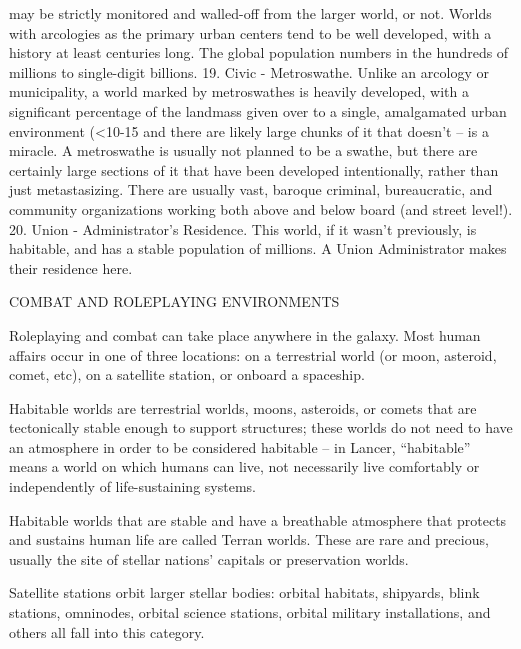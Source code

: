          may be strictly monitored and walled-off from the larger world, or not. Worlds with  
         arcologies as the primary urban centers tend to be well developed, with a history at least  
         centuries long. The global population numbers in the hundreds of millions to single-digit  
         billions.   
     19. Civic - Metroswathe. Unlike an arcology or municipality, a world marked by metroswathes  
         is heavily developed, with a significant percentage of the landmass given over to a single,  
         amalgamated urban environment (<10-15%
         and there are likely large chunks of it that doesn’t -- is a miracle. A metroswathe is usually  
         not planned to be a swathe, but there are certainly large sections of it that have been  
         developed intentionally, rather than just metastasizing. There are usually vast, baroque  
         criminal, bureaucratic, and community organizations working both above and below board  
         (and street level!).   
    20. Union - Administrator’s Residence. This world, if it wasn’t previously, is habitable, and has  
         a stable population of millions. A Union Administrator makes their residence here.    

COMBAT AND ROLEPLAYING ENVIRONMENTS  

Roleplaying and combat can take place anywhere in the galaxy. Most human affairs occur in one  
of three locations: on a terrestrial world (or moon, asteroid, comet, etc), on a satellite station, or  
onboard a spaceship. 
 

                                                                                                                    


Habitable worlds are terrestrial worlds, moons, asteroids, or comets that are tectonically stable  
enough to support structures; these worlds do not need to have an atmosphere in order to be  
considered habitable -- in Lancer, “habitable” means a world on which humans can live, not  
necessarily live comfortably or independently of life-sustaining systems. 
 

Habitable worlds that are stable and have a breathable atmosphere that protects and sustains  
human life are called Terran worlds. These are rare and precious, usually the site of stellar  
nations’ capitals or preservation worlds. 
 

Satellite stations orbit larger stellar bodies: orbital habitats, shipyards, blink stations, omninodes,  
orbital science stations, orbital military installations, and others all fall into this category. 
 

